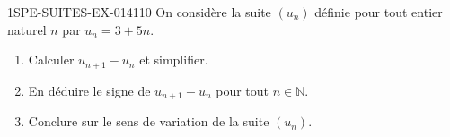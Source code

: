 \begin{exercice}{1SPE-SUITES-EX-014}{1}{10}
On considère la suite $(u_n)$ définie pour tout entier naturel $n$ par $u_n = 3 + 5n$.
\begin{enumerate}
  \item Calculer $u_{n+1} - u_n$ et simplifier.
  \item En déduire le signe de $u_{n+1} - u_n$ pour tout $n \in \mathbb{N}$.
  \item Conclure sur le sens de variation de la suite $(u_n)$.
\end{enumerate}
\end{exercice}
